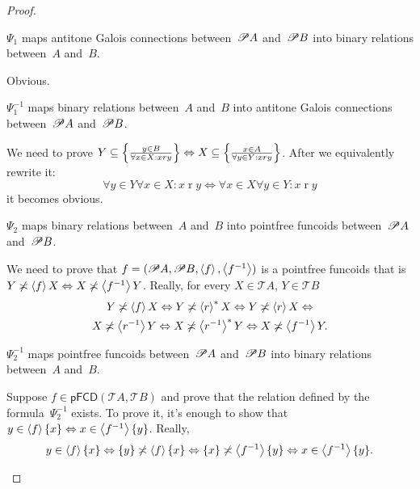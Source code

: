 \begin{proof}
\begin{claim}
$\Psi_1$ maps antitone Galois connections between~$\mathscr{P} A$ and~$\mathscr{P} B$ into binary relations between~$A$ and~$B$.
\end{claim}
\begin{claimproof}
Obvious.
\end{claimproof}

\begin{claim}
$\Psi_1^{-1}$ maps binary relations between~$A$ and~$B$ into antitone Galois connections between~$\mathscr{P} A$ and~$\mathscr{P} B$.
\end{claim}
\begin{claimproof}
We need to prove $Y\subseteq\left\{ \frac{y\in B}{\forall x\in X:x\mathrel{r}y}\right\}\Leftrightarrow X\subseteq\left\{ \frac{x\in A}{\forall y\in Y:x\mathrel{r}y}\right\}$.
After we equivalently rewrite it:
\[\forall y\in Y \forall x\in X:x\mathrel{r}y\Leftrightarrow\forall x\in X\forall y\in Y:x\mathrel{r}y\]
it becomes obvious.
\end{claimproof}

\begin{claim}
$\Psi_2$ maps binary relations between~$A$ and~$B$ into pointfree funcoids between~$\mathscr{P} A$ and~$\mathscr{P} B$.
\end{claim}
\begin{claimproof}
We need to prove that $f=(\mathscr{P} A,\mathscr{P} B,\left\langle f\right\rangle,\left\langle f^{-1}\right\rangle)$ is a pointfree funcoids that is $Y\not\asymp\left\langle f\right\rangle X\Leftrightarrow X\not\asymp\left\langle f^{-1}\right\rangle Y$. Really, for every
$X\in\mathscr{T}A$, $Y\in\mathscr{T}B$ 
\begin{multline*}
Y\not\asymp\left\langle f\right\rangle X\Leftrightarrow Y\not\asymp\left\langle r\right\rangle ^{\ast}X\Leftrightarrow Y\not\asymp\left\langle r\right\rangle X\Leftrightarrow\\
X\not\asymp\left\langle r^{-1}\right\rangle Y\Leftrightarrow X\not\asymp\left\langle r^{-1}\right\rangle ^{\ast}Y\Leftrightarrow X\not\asymp\left\langle f^{-1}\right\rangle Y.
\end{multline*}
\end{claimproof}

\begin{claim}
$\Psi_2^{-1}$ maps pointfree funcoids between~$\mathscr{P} A$ and~$\mathscr{P} B$ into binary relations between~$A$ and~$B$.
\end{claim}
\begin{claimproof}
Suppose $f\in\mathsf{pFCD}(\mathscr{T}A,\mathscr{T}B)$ and prove
that the relation defined by the formula~$\Psi_2^{-1}$ exists.
To prove it, it's enough to show that $y\in\left\langle f\right\rangle\{x\}\Leftrightarrow x\in\left\langle f^{-1}\right\rangle\{y\}$.
Really, 
\[
y\in\left\langle f\right\rangle\{x\}\Leftrightarrow\{y\}\not\asymp\left\langle f\right\rangle\{x\}\Leftrightarrow\{x\}\not\asymp\left\langle f^{-1}\right\rangle\{y\}\Leftrightarrow x\in\left\langle f^{-1}\right\rangle\{y\}.
\]
\end{claimproof}


\end{proof}

